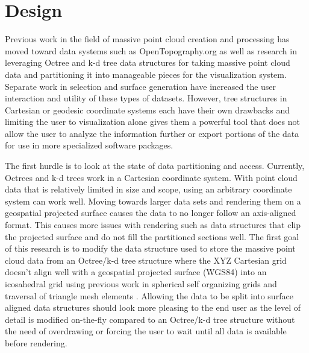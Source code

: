 \chapter{Design}
Previous work in the field of massive point cloud creation and processing has
moved toward data systems
\cite{6_krishnan_crosby_nandigam_phan_cowart_baru_arrowsmith_2011} such as
OpenTopography.org as well as research in leveraging Octree and k-d tree data
structures for taking massive point cloud data and partitioning it into
manageable pieces for the visualization system.
Separate work in selection and surface generation have increased the user
interaction and utility of these types of datasets. However, tree structures in
Cartesian or geodesic coordinate systems each have their own drawbacks and
limiting the user to visualization alone gives them a powerful tool that does
not allow the user to analyze the information further or export portions of the
data for use in more specialized software packages.

The first hurdle is to look at the state of data partitioning and access.
Currently, Octrees and k-d trees work in a Cartesian coordinate system. With
point cloud data that is relatively limited in size and scope, using an
arbitrary coordinate system can work well. Moving towards larger data sets and
rendering them on a geospatial projected surface causes the data to no longer
follow an axis-aligned format. This causes more issues with rendering such as
data structures that clip the projected surface and do not fill the partitioned
sections well. The first goal of this research is to modify the data structure
used to store the massive point cloud data from an Octree/k-d tree structure
where the XYZ Cartesian grid doesn't align well with a geospatial projected
surface (WGS84) into an icosahedral grid using previous work in spherical self
organizing grids \cite{7_wutakatsuka_2006} and traversal of triangle mesh
elements \cite{8_lee1998traversing} \cite{9_white_2000}.
Allowing the data to be split into surface aligned data structures should look
more pleasing to the end user as the level of detail is modified on-the-fly
compared to an Octree/k-d tree structure without the need of overdrawing or
forcing the user to wait until all data is available before rendering.

